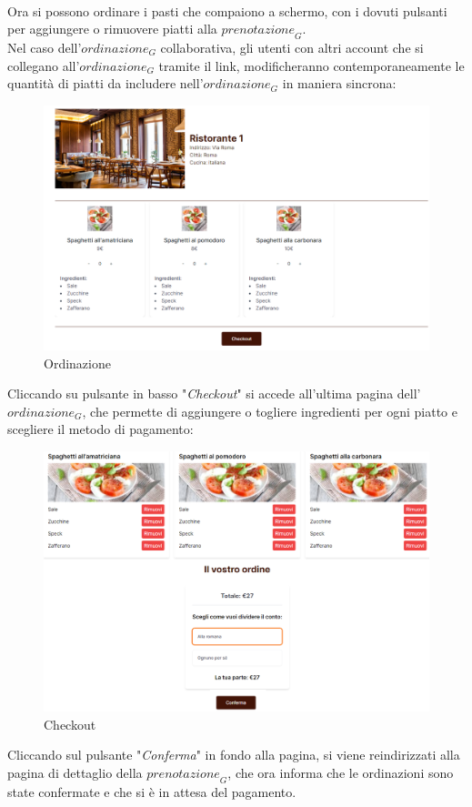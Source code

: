 \\ Ora si possono ordinare i pasti che compaiono a schermo, con i dovuti pulsanti per aggiungere o rimuovere piatti alla $\textit{prenotazione}_G$.
\\Nel caso dell'$\textit{ordinazione}_G$ collaborativa, gli utenti con altri account che si collegano all'$\textit{ordinazione}_G$ tramite il link, modificheranno contemporaneamente le quantità di piatti da includere nell'$\textit{ordinazione}_G$ in maniera sincrona:
\begin{figure}[H]
    \centering
    \includegraphics[width=0.7\linewidth]{img/ordinazione_ristorante.PNG}
    \caption{Ordinazione}
    \label{fig:Ordinazione}
\end{figure}
Cliccando su pulsante in basso "\emph{Checkout}" si accede all'ultima pagina dell'$\textit{ordinazione}_G$, che permette di aggiungere o togliere ingredienti per ogni piatto e scegliere il metodo di pagamento:
\begin{figure}[H]
    \centering
    \includegraphics[width=0.7\linewidth]{img/checkout.PNG}
    \caption{Checkout}
    \label{fig:checkout}
\end{figure}
Cliccando sul pulsante "\emph{Conferma}" in fondo alla pagina, si viene reindirizzati alla pagina di dettaglio della $\textit{prenotazione}_G$, che ora informa che le ordinazioni sono state confermate e che si è in attesa del pagamento.
\newpage
